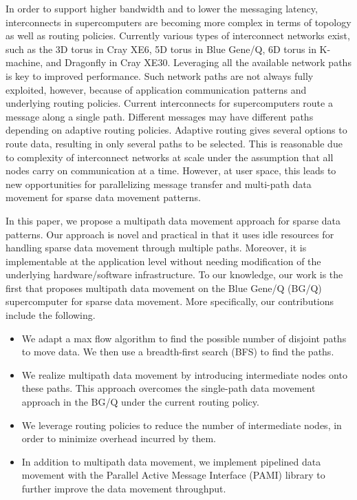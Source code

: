 \documentclass[final,5p,times]{elsarticle}
\begin{document}
In order to support higher bandwidth and to lower the messaging latency, interconnects in supercomputers are becoming more complex in terms of topology as well as routing policies. Currently various types of interconnect networks exist, such as the 3D torus in Cray XE6, 5D torus in Blue Gene/Q, 6D torus in K-machine, and Dragonfly in Cray XE30.  Leveraging all the available network paths is key to improved performance. Such network paths are not always fully exploited, however, because of application communication patterns and underlying routing policies. Current interconnects for supercomputers route a message along a single path. Different messages may have different paths depending on adaptive routing policies.
Adaptive routing gives several options to route data, resulting in only several paths to be selected. This is reasonable due to complexity of interconnect networks at scale under the assumption that all nodes carry on communication at a time. However, at user space, this leads to new opportunities for parallelizing message transfer and multi-path data movement for sparse data movement patterns.

In this paper, we propose a multipath data movement approach for sparse data patterns. Our approach is novel and practical in that it uses idle resources for handling sparse data movement through multiple paths. Moreover, it is implementable at the application level without needing modification of the underlying
hardware/software infrastructure. To our knowledge, our work is the first that proposes multipath data movement on the Blue Gene/Q (BG/Q) supercomputer for sparse data movement. More specifically, our contributions include the following.
\begin{itemize}
\item We adapt a max flow algorithm to find the possible number of disjoint paths to move data. 
We then use a breadth-first search (BFS) to find the paths. 
\item We realize multipath data movement by introducing intermediate nodes onto these paths. This approach overcomes the single-path data movement approach in the BG/Q under the current routing policy.
\item We leverage routing policies to reduce the number of intermediate nodes, in order to minimize overhead incurred by them.
\item In addition to multipath data movement, we implement pipelined data movement with the Parallel Active Message Interface (PAMI) library to further improve the data movement throughput.
\end{itemize}
\end{document}
